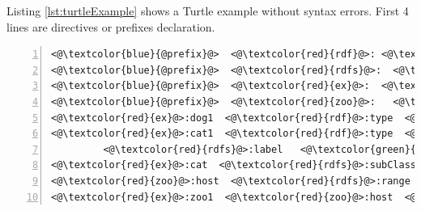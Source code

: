 Listing \ref{lst:turtleExample} shows a Turtle example without syntax errors. First 4 lines are directives or prefixes declaration. 

\begin{lstlisting}[label=lst:turtleExample, numbers=left, caption={RDF example in Turtle serialization format}]
<@\textcolor{blue}{@prefix}@>  <@\textcolor{red}{rdf}@>: <@\textcolor{orange}{<http://www.w3.org/1999/02/22-rdf-syntax-ns#>}@> .
<@\textcolor{blue}{@prefix}@>  <@\textcolor{red}{rdfs}@>:  <@\textcolor{orange}{<http://www.w3.org/2000/01/rdf-schema#>}@> .
<@\textcolor{blue}{@prefix}@>  <@\textcolor{red}{ex}@>:  <@\textcolor{orange}{<http://example.org/>}@> .
<@\textcolor{blue}{@prefix}@>  <@\textcolor{red}{zoo}@>:   <@\textcolor{orange}{<http://example.org/zoo/> }@> .
<@\textcolor{red}{ex}@>:dog1  <@\textcolor{red}{rdf}@>:type  <@\textcolor{red}{ex}@>:animal .
<@\textcolor{red}{ex}@>:cat1  <@\textcolor{red}{rdf}@>:type  <@\textcolor{red}{ex}@>:cat ;
         <@\textcolor{red}{rdfs}@>:label   <@\textcolor{green}{"Lusi"@en}@> .
<@\textcolor{red}{ex}@>:cat  <@\textcolor{red}{rdfs}@>:subClassOf  <@\textcolor{red}{ex}@>:animal .
<@\textcolor{red}{zoo}@>:host  <@\textcolor{red}{rdfs}@>:range  <@\textcolor{red}{ex}@>:animal .
<@\textcolor{red}{ex}@>:zoo1  <@\textcolor{red}{zoo}@>:host  <@\textcolor{red}{ex}@>:cat2 .
\end{lstlisting}










